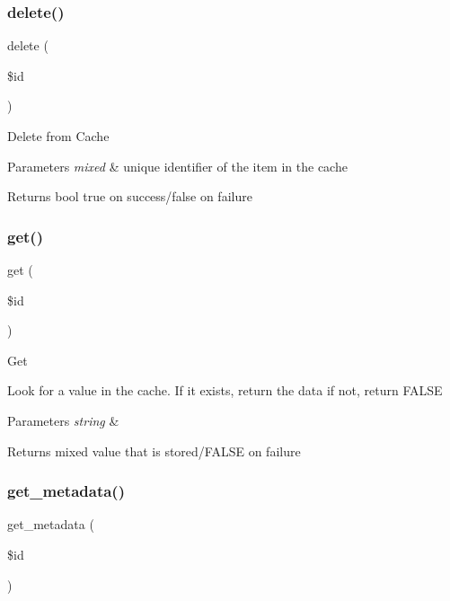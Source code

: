 \subsubsection{\texorpdfstring{delete()}{delete()}}
{\footnotesize\ttfamily delete (\begin{DoxyParamCaption}\item[{}]{\$id }\end{DoxyParamCaption})}

Delete from Cache


\begin{DoxyParams}{Parameters}
{\em mixed} & unique identifier of the item in the cache \\
\hline
\end{DoxyParams}
\begin{DoxyReturn}{Returns}
bool true on success/false on failure 
\end{DoxyReturn}
\mbox{\label{class_c_i___cache__apcu_a50e3bfb586b2f42932a6a93f3fbb0828}} 
\subsubsection{\texorpdfstring{get()}{get()}}
{\footnotesize\ttfamily get (\begin{DoxyParamCaption}\item[{}]{\$id }\end{DoxyParamCaption})}

Get

Look for a value in the cache. If it exists, return the data if not, return F\+A\+L\+SE


\begin{DoxyParams}{Parameters}
{\em string} & \\
\hline
\end{DoxyParams}
\begin{DoxyReturn}{Returns}
mixed value that is stored/\+F\+A\+L\+SE on failure 
\end{DoxyReturn}
\mbox{\label{class_c_i___cache__apcu_a59635cf18e997c5141bffa05ff7622e0}} 
\subsubsection{\texorpdfstring{get\+\_\+metadata()}{get\_metadata()}}
{\footnotesize\ttfamily get\+\_\+metadata (\begin{DoxyParamCaption}\item[{}]{\$id }\end{DoxyParamCaption})}

